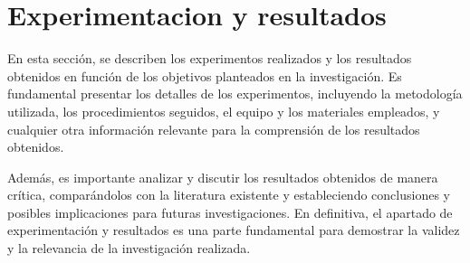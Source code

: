 \section{Experimentacion y resultados}
En esta sección, se describen los experimentos realizados y los resultados obtenidos en función de 
los objetivos planteados en la investigación. Es fundamental presentar los detalles de los experimentos, incluyendo la metodología utilizada, los procedimientos seguidos, el equipo y los materiales empleados, y cualquier otra información relevante para la comprensión de los resultados obtenidos.

Además, es importante analizar y discutir los resultados obtenidos de manera crítica, comparándolos con la literatura existente y estableciendo conclusiones y posibles implicaciones para futuras investigaciones. En definitiva, el apartado de experimentación y resultados es una parte fundamental para demostrar la validez y la relevancia de la investigación realizada.


\pagebreak

